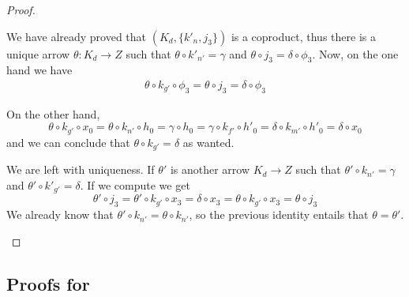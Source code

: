 \documentclass[a4paper,UKenglish,cleveref,pdftex,thm-restate,numberwithinsect]{lipics-v2021}
\begin{document}
\begin{proof}
\begin{enumerate}
 We have already proved that $(K_d, \{k'_n, j_3\})$ is a coproduct, thus there is a unique arrow $\theta\colon K_d\to Z$ such that  $\theta \circ k'_{n'}=\gamma$ and $\theta \circ j_3=\delta \circ \phi_3 $.
 Now, on the one hand we have
 \begin{align*}
 	\theta \circ k_{g'}\circ \phi_3=\theta \circ  j_3=\delta\circ \phi_3 
 \end{align*}
 
 On the other hand, 
 \[\theta \circ k_{g'}\circ x_0=\theta \circ k_{n'}\circ h_0=\gamma \circ h_0=\gamma \circ k_{f'}\circ h'_0=\delta \circ k_{m'}\circ h'_0=\delta \circ x_0 \]
 and we can conclude that $\theta \circ k_{g'}=\delta$ as wanted.
 
 
 We are left with uniqueness. If $\theta'$ is another arrow $K_d\to Z$ such that $\theta'\circ k_{n'}=\gamma$ and $\theta'\circ k'_{g'}= \delta$. If we compute we get
 \[\theta'\circ j_3=\theta'\circ k_{g'}\circ x_3=\delta \circ x_3=\theta \circ k_{g'}\circ x_3=\theta \circ j_3 \]
 We already know that $\theta'\circ k_{n'}=\theta \circ k_{n'}$, so the previous identity entails that $\theta =\theta'$.
			 \qedhere 
	\end{enumerate}
\end{proof}




\subsection{Proofs for }\label{app:due}
\fhyp*
\end{document}
